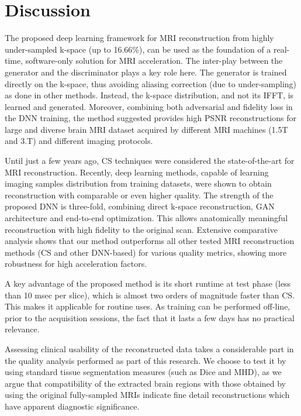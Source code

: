\documentclass[review]{elsarticle}
\begin{document}
\section{Discussion}\label{conclusions_section}
The proposed deep learning framework for MRI reconstruction from highly under-sampled k-space (up to 16.66\%), can be used as the foundation of a real-time, software-only solution for MRI acceleration.
The inter-play between the generator and the discriminator plays a key role here. The generator is trained directly on the k-space, thus avoiding aliasing correction (due to under-sampling) as done in other methods.
Instead, the k-space distribution, and not its IFFT, is learned and generated. Moreover, combining both adversarial and fidelity loss in the DNN training, the method suggested provides high PSNR reconstructions for large and diverse brain MRI dataset acquired by different MRI machines (1.5T and 3.T) and different imaging protocols.

Until just a few years ago, CS techniques were considered the state-of-the-art for MRI reconstruction. Recently, deep learning methods, capable of learning imaging samples distribution from training datasets, were shown to obtain reconstruction with comparable or even higher quality. The strength of the proposed DNN is three-fold, combining direct k-space reconstruction, GAN architecture and end-to-end optimization.
This allows anatomically meaningful reconstruction with high fidelity to the original scan. Extensive comparative analysis shows that our method outperforms all other tested MRI reconstruction methods (CS and other DNN-based) for various quality metrics, showing more robustness for high acceleration factors.

A key advantage of the proposed method is its short runtime at test phase (less than 10 msec per slice), which is almost two orders of magnitude faster than CS. This makes it applicable for routine uses. As training can be performed off-line, prior to the acquisition sessions, the fact that it lasts a few days has no practical relevance.

Assessing clinical usability of the reconstructed data takes a considerable part in the quality analysis performed as part of this research. We choose to test it by using standard tissue segmentation measures (such as Dice and MHD), as we argue that compatibility of the extracted brain regions with those obtained by using the original fully-sampled MRIs indicate fine detail reconstructions which have apparent diagnostic significance. 
\end{document}

